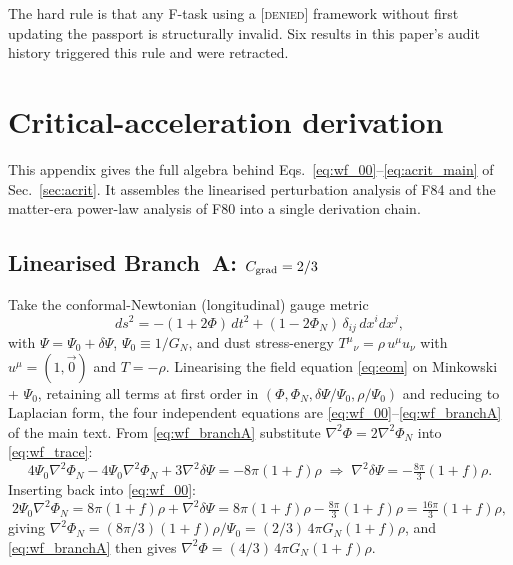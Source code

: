 \documentclass[aps,prd,twocolumn,nofootinbib,floatfix,superscriptaddress]{revtex4-2}
\begin{document}
The hard rule is that any F-task using a \textsc{[denied]} framework
without first updating the passport is structurally invalid. Six
results in this paper's audit history triggered this rule and were
retracted.

\section{Critical-acceleration derivation}
\label{app:acrit_derivation}

This appendix gives the full algebra behind
Eqs.~\eqref{eq:wf_00}--\eqref{eq:acrit_main} of
Sec.~\ref{sec:acrit}. It assembles the linearised perturbation
analysis of F84 and the matter-era power-law analysis of F80 into a
single derivation chain.

\subsection{Linearised Branch~A: $C_{\rm grad} = 2/3$}
\label{app:Cgrad}

Take the conformal-Newtonian (longitudinal) gauge metric
\begin{equation}
ds^2 = -(1+2\Phi)\,dt^2 + (1-2\Phi_N)\,\delta_{ij}\,dx^i dx^j,
\end{equation}
with $\Psi = \Psi_0 + \delta\Psi$, $\Psi_0 \equiv 1/G_N$, and dust
stress-energy $T^\mu{}_\nu = \rho\,u^\mu u_\nu$ with $u^\mu = (1,\vec 0)$
and $T = -\rho$. Linearising the field equation \eqref{eq:eom} on
Minkowski + $\Psi_0$, retaining all terms at first order in
$(\Phi, \Phi_N, \delta\Psi/\Psi_0, \rho/\Psi_0)$ and reducing to
Laplacian form, the four independent equations are
\eqref{eq:wf_00}--\eqref{eq:wf_branchA} of the main text. From
\eqref{eq:wf_branchA} substitute $\nabla^2\Phi = 2\nabla^2\Phi_N$
into \eqref{eq:wf_trace}:
\begin{equation}
4\Psi_0\nabla^2\Phi_N - 4\Psi_0\nabla^2\Phi_N + 3\nabla^2\delta\Psi
= -8\pi(1+f)\rho \;\Longrightarrow\;
\nabla^2\delta\Psi = -\tfrac{8\pi}{3}(1+f)\rho.
\end{equation}
Inserting back into \eqref{eq:wf_00}:
\begin{equation}
2\Psi_0\nabla^2\Phi_N = 8\pi(1+f)\rho + \nabla^2\delta\Psi
= 8\pi(1+f)\rho - \tfrac{8\pi}{3}(1+f)\rho
= \tfrac{16\pi}{3}(1+f)\rho,
\end{equation}
giving $\nabla^2\Phi_N = (8\pi/3)(1+f)\rho/\Psi_0 = (2/3)\,4\pi
G_N(1+f)\rho$, and \eqref{eq:wf_branchA} then gives
$\nabla^2\Phi = (4/3)\,4\pi G_N(1+f)\rho$.
\end{document}

